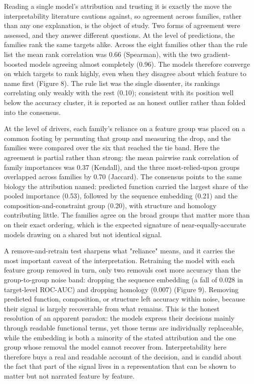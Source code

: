 \documentclass[11pt,twocolumn]{article}
\begin{document}
Reading a single model's attribution and trusting it is exactly the move the interpretability literature cautions against, so agreement across families, rather than any one explanation, is the object of study. Two forms of agreement were assessed, and they answer different questions. At the level of predictions, the families rank the same targets alike. Across the eight families other than the rule list the mean rank correlation was 0.66 (Spearman), with the two gradient-boosted models agreeing almost completely (0.96). The models therefore converge on which targets to rank highly, even when they disagree about which feature to name first (Figure 8). The rule list was the single dissenter, its rankings correlating only weakly with the rest (0.10); consistent with its position well below the accuracy cluster, it is reported as an honest outlier rather than folded into the consensus.

At the level of drivers, each family's reliance on a feature group was placed on a common footing by permuting that group and measuring the drop, and the families were compared over the six that reached the tie band. Here the agreement is partial rather than strong: the mean pairwise rank correlation of family importances was 0.37 (Kendall), and the three most-relied-upon groups overlapped across families by 0.70 (Jaccard). The consensus points to the same biology the attribution named: predicted function carried the largest share of the pooled importance (0.53), followed by the sequence embedding (0.21) and the composition-and-constraint group (0.20), with structure and homology contributing little. The families agree on the broad groups that matter more than on their exact ordering, which is the expected signature of near-equally-accurate models drawing on a shared but not identical signal.

A remove-and-retrain test sharpens what "reliance" means, and it carries the most important caveat of the interpretation. Retraining the model with each feature group removed in turn, only two removals cost more accuracy than the group-to-group noise band: dropping the sequence embedding (a fall of 0.028 in target-level ROC-AUC) and dropping homology (0.007) (Figure 9). Removing predicted function, composition, or structure left accuracy within noise, because their signal is largely recoverable from what remains. This is the honest resolution of an apparent paradox: the models express their decisions mainly through readable functional terms, yet those terms are individually replaceable, while the embedding is both a minority of the stated attribution and the one group whose removal the model cannot recover from. Interpretability here therefore buys a real and readable account of the decision, and is candid about the fact that part of the signal lives in a representation that can be shown to matter but not narrated feature by feature.
\end{document}
